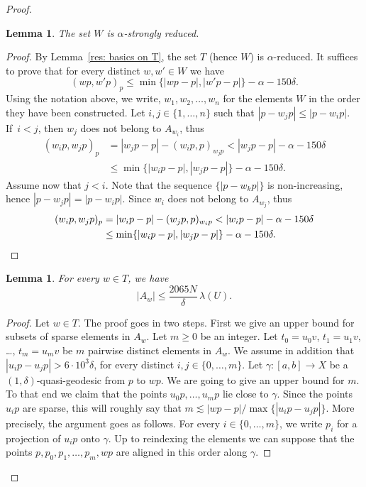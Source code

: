 \documentclass[JEP,XML,SOM,Unicode, NoEqCountersInSection,published]{cedram}
\theoremstyle{plain}
\newtheorem{lem}[thm]{Lemma}
\theoremstyle{definition}
\begin{document}
\begin{proof}
\begin{lem}\label{L: construction of sub-semi-group 4}
The set $W$ is $\alpha$-strongly reduced.
\end{lem}

\begin{proof}
By Lemma~\ref{res: basics on T}, the set $T$ (hence $W$) is $\alpha$-reduced.
It suffices to prove that for every distinct $w,w' \in W$ we have
\begin{equation*}
(wp,w'p)_p \leq \min \{ |wp - p|, |w'p-p|\} - \alpha - 150\delta.
\end{equation*}
Using the notation above, we write, $w_1, w_2, \dots, w_n$ for the elements $W$ in the order they have been constructed.
Let $i,j \in \{1, \dots, n\}$ such that $|p - w_jp| \leq |p - w_ip|$.
If~$i < j$, then $w_j$ does not belong to $A_{w_i}$, thus
\begin{align*}
(w_ip, w_jp)_p
& = |w_jp-p| - (w_ip, p)_{w_jp} < |w_jp-p| - \alpha - 150\delta \\
& \leq \min \{ |w_ip - p|, |w_jp-p|\} - \alpha - 150\delta.
\end{align*}
Assume now that $j < i$.
Note that the sequence $\{|p - w_kp|\}$ is non-increasing, hence $|p - w_jp| = |p -w_ip|$.
Since $w_i$ does not belong to $A_{w_j}$, thus
\begin{align*}
(w_ip, w_jp)_p
& = |w_ip-p| - (w_jp, p)_{w_ip}
< |w_ip-p| - \alpha - 150\delta \\
& \leq \min \{ |w_ip - p|, |w_jp-p|\} - \alpha - 150\delta. \qedhere
\end{align*}
\end{proof}

\begin{lem}\label{L: construction of sub-semi-group 3}
For every $w \in T$, we have
\begin{equation*}
|A_w| \leq \frac{2065N}{\delta}\, \lambda(U).
\end{equation*}
\end{lem}

\begin{proof}
Let $w \in T$.
The proof goes in two steps.
First we give an upper bound for subsets of sparse elements in $A_w$.
Let $m \geq 0$ be an integer.
Let $t_0 = u_0v$, $t_1 = u_1v$, \dots, $t_m = u_mv$ be $m$ pairwise distinct elements in $A_w$.
We assume in addition that $|u_ip - u_jp| > 6\cdot 10^3\delta$, for every distinct $i,j \in \{0, \dots,m\}$.
Let $\gamma \colon [a,b] \to X$ be a $(1, \delta)$-quasi-geodesic from $p$ to $wp$.
We are going to give an upper bound for $m$.
To that end we claim that the points $u_0p, \dots, u_mp$ lie close to $\gamma$.
Since the points $u_ip$ are sparse, this will roughly say that $m \lesssim |wp-p| / \max\{ |u_ip - u_jp|\}$.
More precisely, the argument goes as follows.
For every $i \in \{0, \dots, m\}$, we write $p_i$ for a projection of $u_ip$ onto $\gamma$.
Up to reindexing the elements we can suppose that the points $p, p_0, p_1, \dots, p_m, wp$ are aligned in this order along $\gamma$.


\end{proof}
\end{proof}
\end{document}

